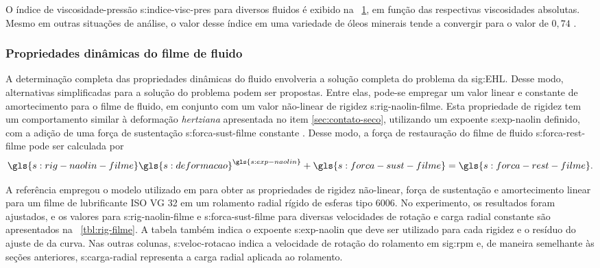 \documentclass[12pt,oneside,english,brazil,lmodern,siglas,simbolos,cite=num]{ucsmonograph}
\begin{document}
	O índice de viscosidade-pressão \gls{s:indice-visc-pres} para diversos fluidos é exibido na \figurename\ \ref{fig:indices-visc-pressao}, em função das respectivas viscosidades absolutas.
	Mesmo em outras situações de análise, o valor desse índice em uma variedade de óleos minerais tende a convergir para o valor de $0,74$ \cite{roelands:1966}.
	
	\begin{figure}[t]
		\label{fig:indices-visc-pressao}
	\end{figure}

	\subsubsection{Propriedades dinâmicas do filme de fluido} \label{sec:props-filme-fluido}
	A determinação completa das propriedades dinâmicas do fluido envolveria a solução completa do problema da \gls{sig:EHL}.
	Desse modo, alternativas simplificadas para a solução do problema podem ser propostas.
	Entre elas, pode-se empregar um valor linear e constante de amortecimento para o filme de fluido, em conjunto com um valor não-linear de rigidez \gls{s:rig-naolin-filme}.
	Esta propriedade de rigidez tem um comportamento similar à deformação \emph{hertziana} apresentada no item \ref{sec:contato-seco}, utilizando um expoente \gls{s:exp-naolin} definido, com a adição de uma força de sustentação \gls{s:forca-sust-filme} constante \cite{nonato:2014}.
	Desse modo, a força de restauração do filme de fluido \gls{s:forca-rest-filme} pode ser calculada por
	\begin{equation} \label{eqn:ehl:forca-rest}
		\gls{s:rig-naolin-filme}\gls{s:deformacao}^{\gls{s:exp-naolin}} +
		\gls{s:forca-sust-filme} = \gls{s:forca-rest-filme}.
	\end{equation}
	
	A referência \cite{nonato:2014} empregou o modelo utilizado em \cite{nonato:2010} para obter as propriedades de rigidez não-linear, força de sustentação e amortecimento linear para um filme de lubrificante ISO VG 32 em um rolamento radial rígido de esferas tipo 6006.
	No experimento, os resultados foram ajustados, e os valores para \gls{s:rig-naolin-filme} e \gls{s:forca-sust-filme} para diversas velocidades de rotação e carga radial constante são apresentados na \tablename\ \ref{tbl:rig-filme}.
	A tabela também indica o expoente \gls{s:exp-naolin} que deve ser utilizado para cada rigidez e o resíduo do ajuste de da curva.
	Nas outras colunas, \gls{s:veloc-rotacao} indica a velocidade de rotação do rolamento em \gls{sig:rpm} e, de maneira semelhante às seções anteriores, \gls{s:carga-radial} representa a carga radial aplicada ao rolamento.	
	
\end{document}
